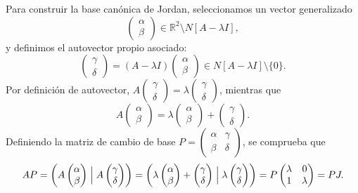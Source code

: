 Para construir la base canónica de Jordan, seleccionamos un vector generalizado
\[
    \begin{pmatrix} \alpha \\ \beta \end{pmatrix} \in \mathbb{R}^2 \setminus N[A - \lambda I],
\]
y definimos el autovector propio asociado:
\[
    \begin{pmatrix} \gamma \\ \delta \end{pmatrix} = (A - \lambda I) \begin{pmatrix} \alpha \\ \beta \end{pmatrix} \in N[A - \lambda I] \setminus \{ 0 \}.
\]
Por definición de autovector, $A \begin{pmatrix} \gamma \\ \delta \end{pmatrix} = \lambda \begin{pmatrix} \gamma \\ \delta \end{pmatrix}$, mientras que
\[
    A \begin{pmatrix} \alpha \\ \beta \end{pmatrix} = \lambda \begin{pmatrix} \alpha \\ \beta \end{pmatrix} + \begin{pmatrix} \gamma \\ \delta \end{pmatrix}.
\]
Definiendo la matriz de cambio de base $P = \begin{pmatrix} \alpha & \gamma \\ \beta & \delta \end{pmatrix}$, se comprueba que
\[
    A P = \left( A \begin{pmatrix} \alpha \\ \beta \end{pmatrix} \Bigm| A \begin{pmatrix} \gamma \\ \delta \end{pmatrix} \right)
    = \left( \lambda \begin{pmatrix} \alpha \\ \beta \end{pmatrix} + \begin{pmatrix} \gamma \\ \delta \end{pmatrix} \Bigm| \lambda \begin{pmatrix} \gamma \\ \delta \end{pmatrix} \right)
    = P \begin{pmatrix} \lambda & 0 \\ 1 & \lambda \end{pmatrix} = P J.
\]
